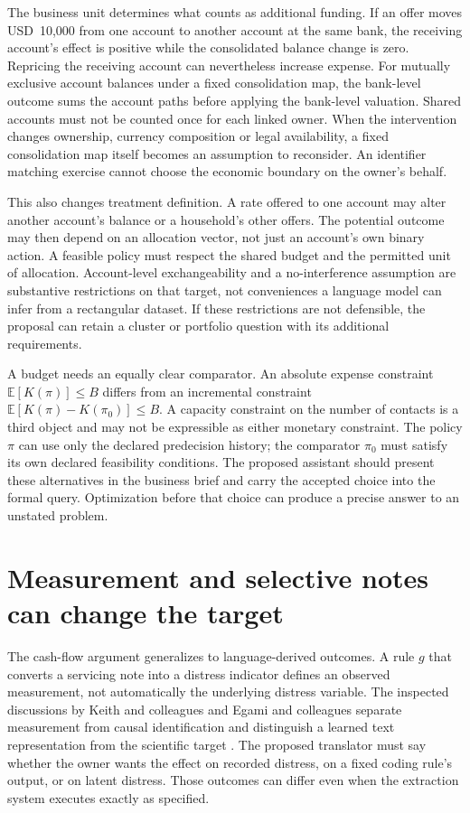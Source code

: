 The business unit determines what counts as additional funding. If an offer
moves USD~10,000 from one account to another account at the same bank, the
receiving account's effect is positive while the consolidated balance change
is zero. Repricing the receiving account can nevertheless increase expense.
For mutually exclusive account balances under a fixed consolidation map,
the bank-level outcome sums the account paths before applying the bank-level
valuation. Shared accounts must not be counted once for each linked owner.
When the intervention changes ownership, currency composition or legal
availability, a fixed consolidation map itself becomes an assumption to
reconsider. An identifier matching exercise cannot choose the economic
boundary on the owner's behalf.

This also changes treatment definition. A rate offered to one account may
alter another account's balance or a household's other offers. The potential
outcome may then depend on an allocation vector, not just an account's own
binary action. A feasible policy must respect the shared budget and the
permitted unit of allocation. Account-level exchangeability and a
no-interference assumption are substantive restrictions on that target,
not conveniences a language model can infer from a rectangular dataset.
If these restrictions are not defensible, the proposal can retain a cluster
or portfolio question with its additional requirements.

A budget needs an equally clear comparator. An absolute expense constraint
$\mathbb E[K(\pi)]\leq B$ differs from an incremental constraint
$\mathbb E[K(\pi)-K(\pi_0)]\leq B$. A capacity constraint on the number of
contacts is a third object and may not be expressible as either monetary
constraint. The policy $\pi$ can use only the declared predecision history;
the comparator $\pi_0$ must satisfy its own declared feasibility conditions.
The proposed assistant should present these alternatives in the business
brief and carry the accepted choice into the formal query. Optimization
before that choice can produce a precise answer to an unstated problem.

\section{Measurement and selective notes can change the target}
\label{exec17:l2-measurement}

The cash-flow argument generalizes to language-derived outcomes. A rule
$g$ that converts a servicing note into a distress indicator defines an
observed measurement, not automatically the underlying distress variable.
The inspected discussions by Keith and colleagues and Egami and colleagues
separate measurement from causal identification and distinguish a learned
text representation from the scientific target
\citep{exec13_census_text_review_arxiv,exec13_census_texts}. The proposed
translator must say whether the owner wants the effect on recorded distress,
on a fixed coding rule's output, or on latent distress. Those outcomes can
differ even when the extraction system executes exactly as specified.

